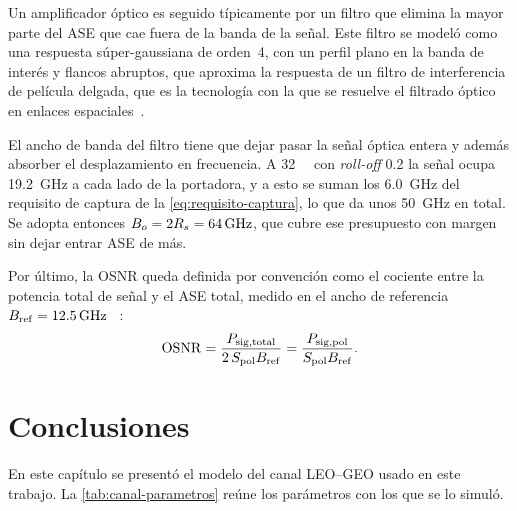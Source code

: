 Un amplificador \'optico es seguido t\'ipicamente por un filtro que elimina la
mayor parte del ASE que cae fuera de la banda de la se\~nal. Este filtro se
model\'o como una respuesta s\'uper-gaussiana de orden~4, con un perfil plano
en la banda de inter\'es y flancos abruptos, que aproxima la respuesta de un
filtro de interferencia de pel\'icula delgada, que es la tecnolog\'ia con la
que se resuelve el filtrado \'optico en enlaces espaciales~\cite{rahmlow2018}.

El ancho de banda del filtro tiene que dejar pasar la se\~nal \'optica entera y adem\'as
absorber el desplazamiento en frecuencia. A \SI{32}{\giga\baud} con \emph{roll-off} \num{0.2} la se\~nal ocupa
\SI{19.2}{\giga\hertz} a cada lado de la portadora, y a esto se suman los
\SI{6.0}{\giga\hertz} del requisito de captura de la
\eqref{eq:requisito-captura}, lo que da unos \SI{50}{\giga\hertz} en total. Se
adopta entonces $B_o = 2R_{s} = \SI{64}{\giga\hertz}$, que cubre ese presupuesto
con margen sin dejar entrar ASE de m\'as.

Por \'ultimo, la OSNR queda definida por convenci\'on como el cociente entre la
potencia total de se\~nal y el ASE total, medido en el ancho de referencia
$B_{\mathrm{ref}} = \SI{12.5}{\giga\hertz}$ ~\cite{mello2021}:
\begin{equation}
  \mathrm{OSNR} = \frac{P_{\mathrm{sig,total}}}{2\,S_{\mathrm{pol}}B_{\mathrm{ref}}}
        = \frac{P_{\mathrm{sig,pol}}}{S_{\mathrm{pol}}B_{\mathrm{ref}}}.
  \label{eq:osnr-def}
\end{equation}


\section{Conclusiones}
\label{sec:canal-conclusiones}

En este cap\'itulo se present\'o el modelo del canal LEO--GEO usado en este
trabajo. La \cref{tab:canal-parametros} re\'une los par\'ametros con los que
se lo simul\'o.

